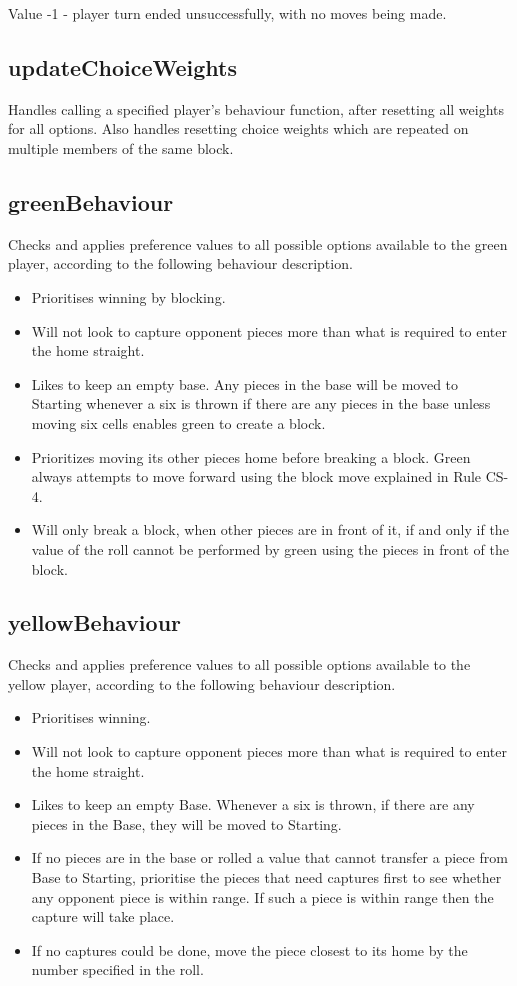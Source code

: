 \documentclass{article}
\begin{document}
Value -1 - player turn ended unsuccessfully, with no moves being made.

\subsection{updateChoiceWeights}
Handles calling a specified player's behaviour function, after resetting all weights for all options. Also handles resetting choice weights which are repeated on multiple members of the same block.

\subsection{greenBehaviour}
Checks and applies preference values to all possible options available to the green player, according to the following behaviour description.
\begin{itemize}
    \item Prioritises winning by blocking.
    \item Will not look to capture opponent pieces more than what is required to enter the home straight.
    \item Likes to keep an empty base. Any pieces in the base will be moved to Starting whenever a six is thrown if there are any pieces in the base unless moving six cells enables green to create a block.
    \item Prioritizes moving its other pieces home before breaking a block. Green always attempts to move forward using the block move explained in Rule CS-4.
    \item Will only break a block, when other pieces are in front of it, if and only if the value of the roll cannot be performed by green using the pieces in front of the block.
\end{itemize}

\subsection{yellowBehaviour}
Checks and applies preference values to all possible options available to the yellow player, according to the following behaviour description.
\begin{itemize}
    \item Prioritises winning.
    \item Will not look to capture opponent pieces more than what is required to enter the home straight.
    \item Likes to keep an empty Base. Whenever a six is thrown, if there are any pieces in the Base, they will be moved to Starting.
    \item If no pieces are in the base or  rolled a value that cannot transfer a piece from Base to Starting, prioritise the pieces that need captures first to see whether any opponent piece is within range. If such a piece is within range then the capture will take place.
    \item If no captures could be done, move the piece closest to its home by the number specified in the roll.
\end{itemize}
\end{document}
